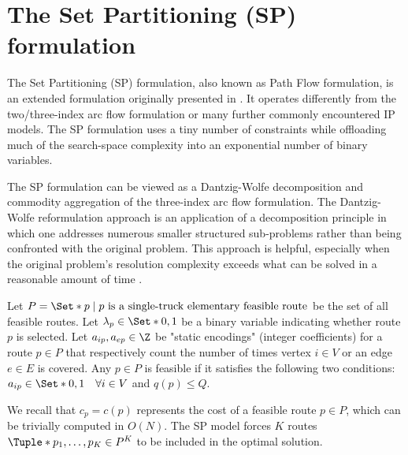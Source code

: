\section{The Set Partitioning (SP) formulation}
\label{sec:set-partitioning-formulation}

The Set Partitioning (SP) formulation,
also known as Path Flow formulation,
is an extended formulation originally presented in \textcite{balinski1964}.
It operates differently from the two/three-index arc flow formulation or many further commonly encountered IP models.
The SP formulation uses a tiny number of constraints
while offloading much of the search-space complexity into an exponential number of binary variables.

The SP formulation can be viewed as a Dantzig-Wolfe decomposition \parencite{dantzig1960}
and commodity aggregation \parencite{desaulniers1998}
of the three-index arc flow formulation.
The Dantzig-Wolfe reformulation approach is an application of a
decomposition principle in which one addresses numerous smaller structured sub-problems
rather than being confronted with the original problem.
This approach is helpful, especially when the
original problem's resolution complexity
exceeds what can be solved in a reasonable amount of time \parencite{vanderbeck2005}.

Let $P = \Set*{p \mid p\ \text{is a single-truck elementary feasible route}}$ be the set of all feasible routes.
Let $\lambda_p \in \Set*{0, 1}$ be a binary variable indicating whether route $p$ is selected.
Let $a_{ip}, a_{ep} \in \Z$ be "static encodings" (integer coefficients)
for a route $p \in P$ that respectively count
the number of times vertex $i \in V$ or an edge $e \in E$ is covered.
Any $p \in P$ is feasible if it satisfies the following two conditions:
$a_{ip} \in \Set*{0, 1} \quad \forall i \in V$ and $q(p) \le Q$.

We recall that $c_p = c(p)$ represents the cost of a feasible route $p \in P$,
which can be trivially computed in $O(N)$.
The SP model forces $K$ routes $\Tuple*{p_1, \dots, p_K} \in P^K$ to be included in the optimal solution.

